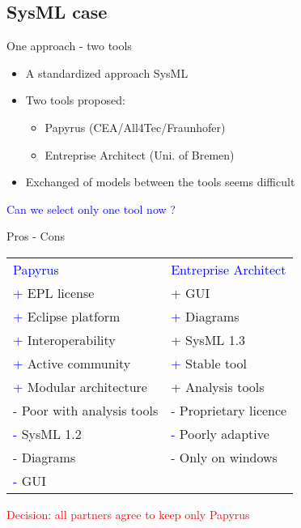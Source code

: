 \subsection{SysML case}


\begin{frame}{One approach  - two tools}
 
 \begin{itemize}
 \item A standardized approach SysML
 \item Two tools proposed:
 
 \begin{itemize}
 \item Papyrus (CEA/All4Tec/Fraunhofer)
 \item Entreprise Architect (Uni. of Bremen)
 \end{itemize}

 \item Exchanged of models between the tools seems difficult
 \end{itemize}

\pause

\textcolor{blue}{Can we select only one tool now ? }
\end{frame}


\begin{frame}{Pros - Cons}
 
 \begin{tabular}{l|l}

\textcolor{blue}{Papyrus} & \textcolor{blue}{Entreprise Architect}  \\

\textcolor{blue}{+} EPL license & \textcolor{blue}{+} GUI  \\
\textcolor{blue}{+} Eclipse platform  & \textcolor{blue}{+} Diagrams  \\
\textcolor{blue}{+} Interoperability  & \textcolor{blue}{+} SysML 1.3  \\
\textcolor{blue}{+} Active community & \textcolor{blue}{+} Stable tool  \\
\textcolor{blue}{+} Modular architecture & \textcolor{blue}{+} Analysis tools  \\
\textcolor{blue}{-} Poor with analysis tools & \textcolor{blue}{-} Proprietary licence  \\
\textcolor{blue}{-} SysML 1.2 & \textcolor{blue}{-} Poorly adaptive  \\
\textcolor{blue}{-} Diagrams & \textcolor{blue}{-} Only on windows  \\
\textcolor{blue}{-} GUI &   \\
\end{tabular} 

\pause

\begin{center}

\textcolor{red}{Decision: all partners agree to  keep only Papyrus }

\end{center}

\end{frame}



